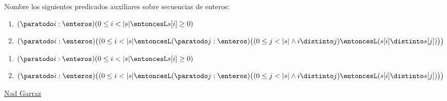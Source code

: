 \begin{enunciado}{\ejercicio}
  Nombre los siguientes predicados auxiliares sobre secuencias de enteros:
  \begin{enumerate}[label=\alph*)]
    \item  {}
          {$(\paratodo i : \enteros)
              (0 \leq i < |s|
              \entoncesL
              s[i] \geq 0)$
          }

    \item  {}
          {$(\paratodo i : \enteros)
              \bigl(
              (0 \leq i < |s|
              \entoncesL
              (\paratodo j : \enteros)
              \bigl(
              (0 \leq j < |s| \land i \distinto j)
              \entoncesL
              (s[i] \distinto s[j])
              \bigr)
              \bigr)$
          }
  \end{enumerate}
\end{enunciado}

\begin{enumerate}[label=\alph*)]
        \item  {}
        {$(\paratodo i : \enteros)
            (0 \leq i < |s|
            \entoncesL
            s[i] \geq 0)$
        }

  \item  {}
        {$(\paratodo i : \enteros)
            \bigl(
            (0 \leq i < |s|
            \entoncesL
            (\paratodo j : \enteros)
            \bigl(
            (0 \leq j < |s| \land i \distinto j)
            \entoncesL
            (s[i] \distinto s[j])
            \bigr)
            \bigr)$
        }
\end{enumerate}

\begin{aportes}
  \item \href{\dirRepo}{Nad Garraz \github}
\end{aportes}
